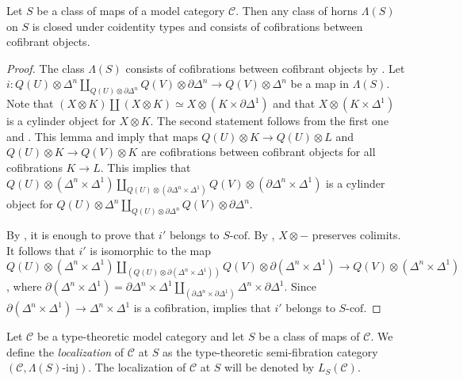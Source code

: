 \documentclass[reqno]{amsart}
\theoremstyle{definition}
\theoremstyle{remark}
\newcommand{\scat}[1]{\mathcal{#1}}
\newcommand{\class}[2]{#1\text{-}\mathrm{#2}}
\newcommand{\I}{\mathrm{I}}
\newcommand{\Icof}[1][\I]{\class{#1}{cof}}
\newcommand{\Iinj}[1][\I]{\class{#1}{inj}}
\numberwithin{figure}{section}
\begin{document}
\begin{lem}
Let $S$ be a class of maps of a model category $\scat{C}$.
Then any class of horns $\Lambda(S)$ on $S$ is closed under coidentity types and consists of cofibrations between cofibrant objects.
\end{lem}
\begin{proof}
The class $\Lambda(S)$ consists of cofibrations between cofibrant objects by \cite[Corollary~16.3.11]{hirschhorn}.
Let $i : Q(U) \otimes \Delta^n \amalg_{Q(U) \otimes \partial \Delta^n} Q(V) \otimes \partial \Delta^n \to Q(V) \otimes \Delta^n$ be a map in $\Lambda(S)$.
Note that $(X \otimes K) \amalg (X \otimes K) \simeq X \otimes (K \times \partial \Delta^1)$ and that $X \otimes (K \times \Delta^1)$ is a cylinder object for $X \otimes K$.
The second statement follows from the first one and \cite[Lemma~16.4.4]{hirschhorn}.
This lemma and \cite[Proposition~16.5.6]{hirschhorn} imply that maps $Q(U) \otimes K \to Q(U) \otimes L$ and $Q(U) \otimes K \to Q(V) \otimes K$ are cofibrations between cofibrant objects for all cofibrations $K \to L$.
This implies that $Q(U) \otimes (\Delta^n \times \Delta^1) \amalg_{Q(U) \otimes (\partial \Delta^n \times \Delta^1)} Q(V) \otimes (\partial \Delta^n \times \Delta^1)$ is a cylinder object
for $Q(U) \otimes \Delta^n \amalg_{Q(U) \otimes \partial \Delta^n} Q(V) \otimes \partial \Delta^n$.

By , it is enough to prove that $i'$ belongs to $\Icof[S]$.
By \cite[Proposition~16.4.3]{hirschhorn}, $X \otimes -$ preserves colimits.
It follows that $i'$ is isomorphic to the map $Q(U) \otimes (\Delta^n \times \Delta^1) \amalg_{(Q(U) \otimes \partial(\Delta^n \times \Delta^1))} Q(V) \otimes \partial(\Delta^n \times \Delta^1) \to Q(V) \otimes (\Delta^n \times \Delta^1)$,
where $\partial(\Delta^n \times \Delta^1) = \partial \Delta^n \times \Delta^1 \amalg_{(\partial \Delta^n \times \partial \Delta^1)} \Delta^n \times \partial \Delta^1$.
Since $\partial(\Delta^n \times \Delta^1) \to \Delta^n \times \Delta^1$ is a cofibration, \cite[Proposition~16.4.5]{hirschhorn} implies that $i'$ belongs to $\Icof[S]$.
\end{proof}

\begin{defn}
Let $\scat{C}$ be a type-theoretic model category and let $S$ be a class of maps of $\scat{C}$.
We define the \emph{localization} of $\scat{C}$ at $S$ as the type-theoretic semi-fibration category $(\scat{C},\Iinj[\Lambda(S)])$.
The localization of $\scat{C}$ at $S$ will be denoted by $L_S(\scat{C})$.
\end{defn}
\end{document}
